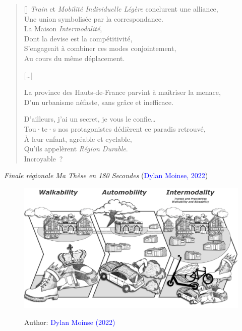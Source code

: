 \begin{verse}[\versewidth]
\textsl{Train} et \textsl{Mobilité Individuelle Légère} conclurent une alliance,\\
Une union symbolisée par la correspondance.\\
La Maison \textsl{Intermodalité},\\
Dont la devise est la compétitivité,\\
S'engageait à combiner ces modes conjointement,\\
Au cours du même déplacement.

[\dots]

La province des Hauts-de-France parvint à maîtriser la menace,\\
D’un urbanisme néfaste, sans grâce et inefficace.

D’ailleurs, j’ai un secret, je vous le confie\dots\\
Tou·te·s nos protagonistes dédièrent ce paradis retrouvé,\\
À leur enfant, agréable et cyclable,\\
Qu’ils appelèrent \textsl{Région Durable}.\\
Incroyable~?\\

\end{verse}
\textsl{Finale régionale Ma Thèse en 180 Secondes} (\textcolor{blue}{Dylan Moinse, 2022})

    \begin{figure}[h!]\vspace*{4pt}
        \caption*{}
        \label{fig-preambule:mt180}
        \centerline{\includegraphics[width=1\columnwidth]{src/Figures/Preambule/EN_MT180_Illustration.jpg}}
        \vspace{5pt}
        \begin{flushright}\scriptsize{
        Author: \textcolor{blue}{Dylan Moinse (2022)}
        }\end{flushright}
    \end{figure}